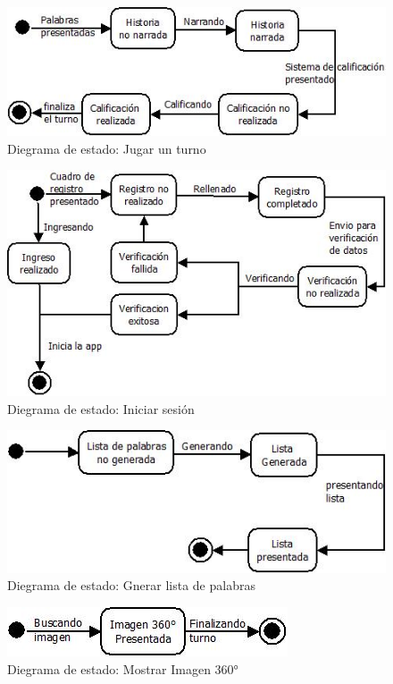 \documentclass[12pt]{article}
\begin{document}
\begin{figure}[H]
	\centering
	\includegraphics[scale=1]{imgs/DiagramaEstado1.png}
	\caption{Diegrama de estado: Jugar un turno}
\end{figure}

\begin{figure}[H]
	\centering
	\includegraphics[scale=1]{imgs/DiagramaEstado2.png}
	\caption{Diegrama de estado: Iniciar sesión}
\end{figure}

\begin{figure}[H]
	\centering
	\includegraphics[scale=1]{imgs/DiagramaEstado3.png}
	\caption{Diegrama de estado: Gnerar lista de palabras}
\end{figure}

\begin{figure}[H]
	\centering
	\includegraphics[scale=1]{imgs/DiagramaEstado4.png}
	\caption{Diegrama de estado: Mostrar Imagen 360°}
\end{figure}
\end{document}
